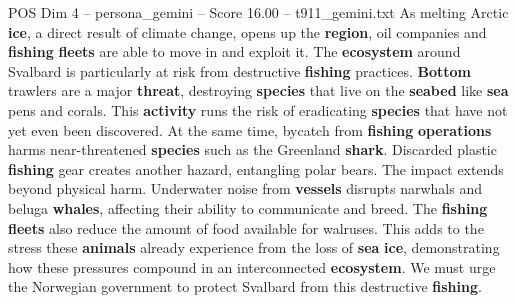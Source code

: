 \begin{textsample}{POS Dim 4 – persona\_gemini – Score 16.00 – t911\_gemini.txt}  \label{ex:f4_pos_045}
As melting Arctic \textbf{ice}, a direct result of climate change, opens up the \textbf{region}, oil companies and \textbf{fishing} \textbf{fleets} are able to move in and exploit it.
The \textbf{ecosystem} around Svalbard is particularly at risk from destructive \textbf{fishing} practices. \textbf{Bottom} trawlers are a major \textbf{threat}, destroying \textbf{species} that live on the \textbf{seabed} like \textbf{sea} pens and corals.
This \textbf{activity} runs the risk of eradicating \textbf{species} that have not yet even been discovered.
At the same time, bycatch from \textbf{fishing} \textbf{operations} harms near-threatened \textbf{species} such as the Greenland \textbf{shark}.
Discarded plastic \textbf{fishing} gear creates another hazard, entangling polar bears.
The impact extends beyond physical harm.
Underwater noise from \textbf{vessels} disrupts narwhals and beluga \textbf{whales}, affecting their ability to communicate and breed.
The \textbf{fishing} \textbf{fleets} also reduce the amount of food available for walruses.
This adds to the stress these \textbf{animals} already experience from the loss of \textbf{sea} \textbf{ice}, demonstrating how these pressures compound in an interconnected \textbf{ecosystem}.
We must urge the Norwegian government to protect Svalbard from this destructive \textbf{fishing}.

\end{textsample}
